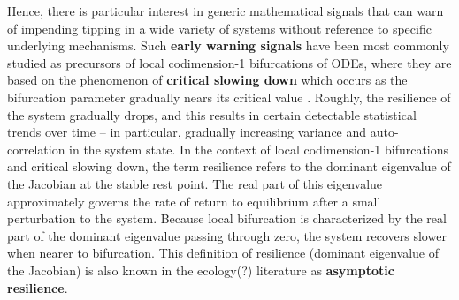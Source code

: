 Hence, there is particular interest in generic mathematical signals that can warn of impending tipping in a wide variety of systems without reference to specific underlying mechanisms. 
%
Such \textbf{early warning signals} have been most commonly studied as precursors of local codimension-1 bifurcations of ODEs, where they are based on the phenomenon of \textbf{critical slowing down} which occurs as the bifurcation parameter gradually nears its critical value \cite{schefferEarlywarningSignalsCritical2009a}.
% 
Roughly, the resilience of the system gradually drops, and this results in certain detectable statistical trends over time -- in particular, gradually increasing variance and auto-correlation in the system state. In the context of local codimension-1 bifurcations and critical slowing down, the term resilience refers to the dominant eigenvalue of the Jacobian at the stable rest point. The real part of this eigenvalue approximately governs the rate of return to equilibrium after a small perturbation to the system. Because local bifurcation is characterized by the real part of the dominant eigenvalue passing through zero, the system recovers slower when nearer to bifurcation. This definition of resilience (dominant eigenvalue of the Jacobian) is also known in the ecology(?) literature as \textbf{asymptotic resilience}. 










